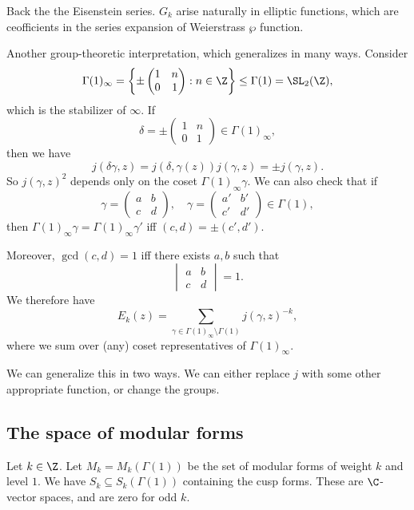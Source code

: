 \documentclass[a4paper]{article}
\begin{document}
Back the the Eisenstein series. $G_k$ arise naturally in elliptic functions, which are ceofficients in the series expansion of Weierstrass $\wp$ function. %

Another group-theoretic interpretation, which generalizes in many ways. Consider
\[
  \Gamma(1)_\infty = \left\{
    \pm
    \begin{pmatrix}
      1 & n\\
      0 & 1
    \end{pmatrix}: n \in \Z
  \right\} \leq \Gamma(1) = \SL_2(\Z),
\]
which is the stabilizer of $\infty$. If
\[
  \delta = \pm
  \begin{pmatrix}
    1 & n\\
    0 & 1
  \end{pmatrix}
  \in \Gamma(1)_\infty,
\]
then we have
\[
  j(\delta\gamma, z) = j(\delta, \gamma(z)) j(\gamma, z) = \pm j(\gamma, z).
\]
So $j(\gamma, z)^2$ depends only on the coset $\Gamma(1)_\infty \gamma$. We can also check that if
\[
  \gamma =
  \begin{pmatrix}
    a & b\\
    c & d
  \end{pmatrix},\quad
  \gamma =
  \begin{pmatrix}
    a' & b'\\
    c' & d'
  \end{pmatrix} \in \Gamma(1),
\]
then $\Gamma(1)_\infty \gamma = \Gamma(1)_\infty \gamma'$ iff $(c, d) = \pm (c', d')$.

Moreover, $\gcd(c, d) = 1 $ iff there exists $a, b$ such that
\[
  \begin{vmatrix}
    a & b\\
    c & d
  \end{vmatrix} = 1.
\]
We therefore have
\[
  E_k(z) = \sum_{\gamma \in \Gamma(1)_\infty \setminus \Gamma(1)} j(\gamma, z)^{-k},
\]
where we sum over (any) coset representatives of $\Gamma(1)_\infty$.

We can generalize this in two ways. We can either replace $j$ with some other appropriate function, or change the groups.

\subsection{The space of modular forms}
Let $k \in \Z$. Let $M_k = M_k(\Gamma(1))$ be the set of modular forms of weight $k$ and level $1$. We have $S_k \subseteq S_k(\Gamma(1))$ containing the cusp forms. These are $\C$-vector spaces, and are zero for odd $k$.
\end{document}

